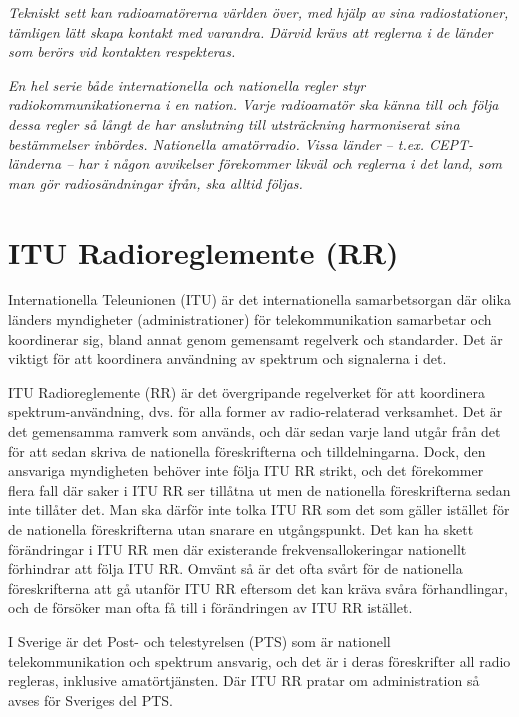 \emph{Tekniskt sett kan radioamatörerna världen över, med hjälp av
  sina radiostationer, tämligen lätt skapa kontakt med
  varandra. Därvid krävs att reglerna i de länder som berörs vid
  kontakten respekteras.}

\emph{En hel serie både internationella och nationella regler styr
  radiokommunikationerna i en nation. Varje radioamatör ska känna
  till och följa dessa regler så långt de har anslutning till
  utsträckning harmoniserat sina bestämmelser inbördes.  Nationella
  amatörradio. Vissa länder -- t.ex. CEPT-länderna -- har i någon
  avvikelser förekommer likväl och reglerna i det land, som man gör
  radiosändningar ifrån, ska alltid följas.}

\section{ITU Radioreglemente (RR)}

Internationella Teleunionen (ITU) är det internationella samarbetsorgan där
olika länders myndigheter (administrationer) för telekommunikation samarbetar
och koordinerar sig, bland annat genom gemensamt regelverk och standarder.
Det är viktigt för att koordinera användning av spektrum och signalerna i det.

ITU Radioreglemente (RR) \cite{ITU-RR} är det övergripande regelverket för att
koordinera spektrum-användning, dvs. för alla former av radio-relaterad
verksamhet. Det är det gemensamma ramverk som används, och där sedan varje land
utgår från det för att sedan skriva de nationella föreskrifterna och
tilldelningarna. Dock, den ansvariga myndigheten behöver inte följa ITU RR
strikt, och det förekommer flera fall där saker i ITU RR ser tillåtna ut men
de nationella föreskrifterna sedan inte tillåter det. Man ska därför inte
tolka ITU RR som det som gäller istället för de nationella föreskrifterna utan
snarare en utgångspunkt. Det kan ha skett förändringar i ITU RR men där
existerande frekvensallokeringar nationellt förhindrar att följa ITU RR.
Omvänt så är det ofta svårt för de nationella föreskrifterna att gå utanför
ITU RR eftersom det kan kräva svåra förhandlingar, och de försöker man ofta
få till i förändringen av ITU RR istället.

I Sverige är det Post- och telestyrelsen (PTS) som är nationell telekommunikation
och spektrum ansvarig, och det är i deras föreskrifter all radio regleras,
inklusive amatörtjänsten. Där ITU RR pratar om administration så avses för
Sveriges del PTS.

